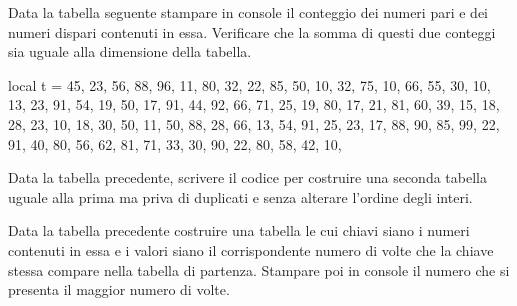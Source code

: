 \begin{Exercise}[label=cos-04]
Data la tabella seguente stampare in console il conteggio dei numeri pari e dei
numeri dispari contenuti in essa. Verificare che la somma di questi due
conteggi sia uguale alla dimensione della tabella.
\begin{lines}
local t = {
    45, 23, 56, 88, 96, 11,
    80, 32, 22, 85, 50, 10,
    32, 75, 10, 66, 55, 30,
    10, 13, 23, 91, 54, 19,
    50, 17, 91, 44, 92, 66,
    71, 25, 19, 80, 17, 21,
    81, 60, 39, 15, 18, 28,
    23, 10, 18, 30, 50, 11,
    50, 88, 28, 66, 13, 54,
    91, 25, 23, 17, 88, 90,
    85, 99, 22, 91, 40, 80,
    56, 62, 81, 71, 33, 30,
    90, 22, 80, 58, 42, 10,
}
\end{lines}
\end{Exercise}

\begin{Exercise}[label=cos-05]
Data la tabella precedente, scrivere il codice per costruire una seconda tabella
uguale alla prima ma priva di duplicati e senza alterare l'ordine degli interi.
\end{Exercise}

\begin{Exercise}[label=cos-06]
Data la tabella precedente costruire una tabella le cui chiavi siano i numeri
contenuti in essa e i valori siano il corrispondente numero di volte che la
chiave stessa compare nella tabella di partenza. Stampare poi in console il
numero che si presenta il maggior numero di volte.
\end{Exercise}

